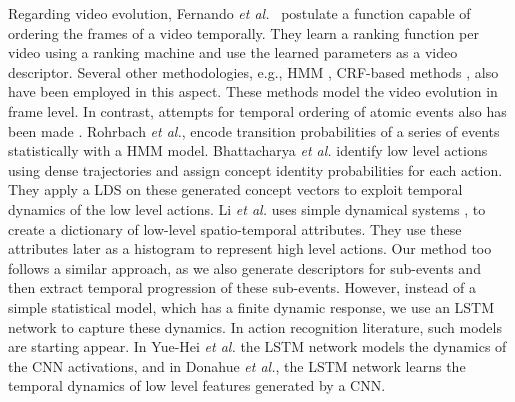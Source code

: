 Regarding video evolution, Fernando \textit{et al.}~\cite{fernando2015modeling} postulate
a function capable of ordering the frames of a video
temporally. They learn a ranking function per video using a ranking machine and use the learned parameters as
a video descriptor. Several other methodologies, e.g., HMM \cite{wang2011hidden, wu2014leveraging},
CRF-based methods \cite{song2013action}, also have been employed in this aspect. These methods model the video evolution in frame
level. In contrast, attempts for temporal ordering of atomic events also has been made \cite{rohrbach2012script, bhattacharya2014recognition}.
Rohrbach \textit{et al.}\cite{rohrbach2012script}, encode transition probabilities of a series of events statistically with a HMM model.
Bhattacharya \textit{et al.}\cite{bhattacharya2014recognition} identify low level actions using dense trajectories and assign concept identity
probabilities for each action. They apply a LDS on these generated concept vectors to exploit temporal
dynamics of the low level actions. Li \textit{et al.}\cite{li2013recognizing} uses simple dynamical systems \cite{jackson1992perspectives},
\cite{kailath1974view} to create a dictionary of low-level spatio-temporal attributes. They use these attributes
later as a histogram to represent high level actions. Our method too follows a similar approach,
as we also generate descriptors for sub-events and then extract temporal progression
of these sub-events. However, instead of a simple statistical model, which has a finite dynamic response,
we use an LSTM network \cite{hochreiter1997long} to capture these dynamics. In action recognition literature,
such models are starting appear. In Yue-Hei \textit{et al.}
\cite{yue2015beyond} the LSTM network models the dynamics of the CNN activations, and in Donahue \textit{et al.}\cite{donahue2015long},
the LSTM network learns the temporal dynamics of low level features generated by a CNN.

